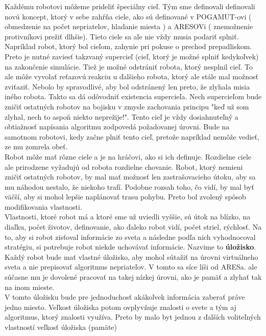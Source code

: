 Každému robotovi môžeme prideliť špeciálny cieľ. Tým sme definovali definovali novú koncept, ktorý v sebe zahŕňa ciele, ako sú definované v POGAMUT-ovi ( obmedzenie na počet nepriatelov, hladanie miesta ) a ARESOVi ( znemožnenie protivníkovi prežiť dlhšie). Tieto ciele sa ale nie vždy musia podariť splniť. Napríklad robot, ktorý bol cieľom, zahynie pri pokuse o prechod prepadliskom. Preto je nutné zaviesť takzvaný supercieľ (cieľ, ktorý je možné splniť kedykoľvek) na zakončenie simulácie. Tiež je možné odstrániť robota, ktorý nesplnil cieľ. To ale môže vyvolať reťazovú reakciu u ďalšieho robota, ktorý ale stále mal možnosť zviťaziť. Nebolo by spravodlivé, aby bol odstránený len preto, že zlyhala misia iného robota. Takto sa dá odôvodniť existencia supercieľa. Nech supercieľom bude zničiť ostatných robotov na bojisku v zmysle zachovania principu "keď už som zlyhal, nech to aspoň niekto neprežije!". Tento cieľ je vždy dosiahnuteľný a obtiažnosť napísania algoritmu zodpovedá požadovanej úrovni. Bude na samotnom robotovi, kedy začne plniť tento cieľ, pretože napríklad nemôže vedieť, ze mu zomrela obeť.\\
\indent Robot môže mať rôzne ciele a je na hráčovi, ako si ich definuje. Rozdielne ciele ale prirodzene vyžadujú od robota rozdielne chovanie. Robot, ktorý nemieni zničiť ostatných robotov, by mal mať možnosť len zastrašovacieho útoku, aby sa mu náhodou nestalo, že niekoho trafí. Podobne rozsah toho, čo vidí, by mal byť väčší, aby si mohol lepšie naplánovať trasu pohybu. Preto bol zvolený spôsob modifikovania vlastnosti. \\
\indent Vlastnosti, ktoré robot má a ktoré sme už uviedli vyššie,  sú útok na blízko, na diaľku, počet životov, definovanie, ako ďaleko robot vidí, počet striel, rýchlosť. Na to, aby si robot zisťoval informácie zo sveta a následne podľa nich vyhodnocoval stratégiu, si potrebuje robot niekde uchovávať informácie. Nazvime to {\bf úložisko}. Každý robot bude mať vlastné úložisko, aby mohol sútažiť na úrovni virtuálneho sveta a nie prepisovať algoritmus nepriateľov. V tomto sa síce líši od ARESa. ale súčasne mu je dovolené pracovať na takej nízkej úrovni, ako je pamäť a zlyhať tak na inom mieste.
\\
V tomto úložisku bude pre jednoduchosť akákoľvek informácia zaberať práve jedno miesto. %
Veľkost úložiska potom ovplyvňuje znalosti o svete a tým aj algoritmus, ktorý znalosti využíva. Preto by malo byt jednou z ďalších voliteľných vlastností veľkosť úložiska (pamäte) \\ %
